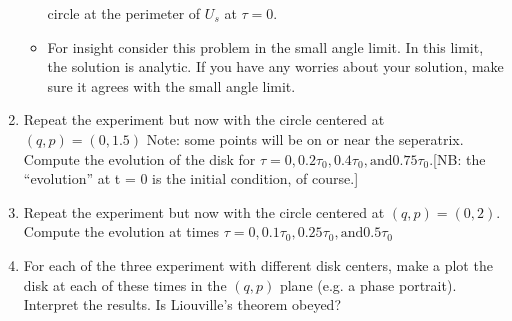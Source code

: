 \begin{enumerate}
\begin{itemize}
    circle at the perimeter of $U_s$ at $\tau = 0$.
    \item For insight consider this problem in the small angle limit. In
    this limit, the solution is analytic. If you have any worries
    about your solution, make sure it agrees with the small angle limit.
    \end{itemize}
\item Repeat the experiment but now with the circle centered at $(q,p)=(0,1.5)$ Note: some points will be on or near the seperatrix. Compute the evolution of the disk for $\tau=0,0.2\tau_0,0.4\tau_0,\mathrm{and}0.75\tau_0$.[NB: the “evolution” at t = 0 is the initial condition, of course.]
\item Repeat the experiment but now with the circle centered at  $(q,p)=(0,2)$. Compute the evolution at times $\tau=0,0.1\tau_0,0.25\tau_0,\mathrm{and}0.5\tau_0$ 
\item For each of the three experiment with different disk centers, make
a plot the disk at each of these times in the $(q,p)$ plane (e.g.
a phase portrait). Interpret the results. Is Liouville’s theorem obeyed?
\end{enumerate}







